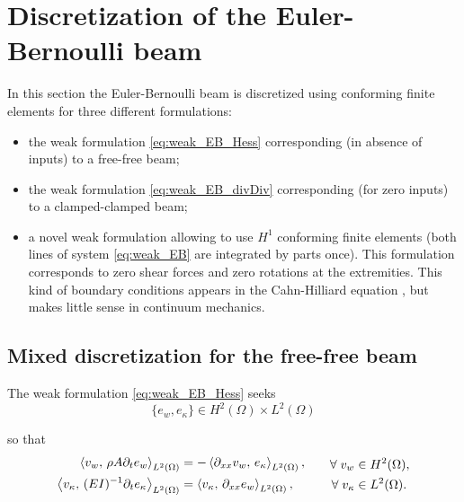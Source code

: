 \section{Discretization of the Euler-Bernoulli beam}
In this section the Euler-Bernoulli beam is discretized using conforming finite elements for three different formulations:
\begin{itemize}
	\item the weak formulation \eqref{eq:weak_EB_Hess} corresponding (in absence of inputs) to a free-free beam;
	\item the weak formulation \eqref{eq:weak_EB_divDiv} corresponding (for zero inputs) to a clamped-clamped beam;
	\item a novel weak formulation allowing to use $H^1$ conforming finite elements (both lines of  system \eqref{eq:weak_EB} are integrated by parts once). This formulation corresponds to zero shear forces and zero rotations at the extremities. This kind of boundary conditions appears in the Cahn-Hilliard equation \cite{cahn1958}, but makes little sense in continuum mechanics.   
\end{itemize}

\subsection{Mixed discretization for the free-free beam}
The weak formulation \eqref{eq:weak_EB_Hess} seeks 
\begin{equation*}
\{e_w, e_\kappa\} \in H^2(\Omega) \times L^2(\Omega)
\end{equation*}

so that
\begin{equation}\label{eq:weak_EB_Hess_nobd}
\begin{aligned}
\inner[L^2(\Omega)]{v_w}{\rho A \partial_t e_w} &= -\inner[L^2(\Omega)]{\partial_{xx} v_w}{e_\kappa}, \\
\inner[L^2(\Omega)]{v_\kappa}{(EI)^{-1} \partial_t e_\kappa} &= \inner[L^2(\Omega)]{v_\kappa}{\partial_{xx} e_w}, \\
\end{aligned}\qquad
\begin{aligned}
\forall \; v_w &\in H^2(\Omega), \\
\forall \; v_\kappa &\in L^2(\Omega).
\end{aligned}
\end{equation}

